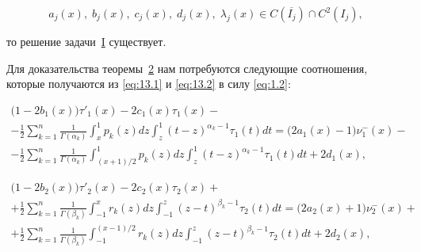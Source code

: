 \begin{equation}

{a_j}(x),\; {b_j}(x),\; {c_j}(x),\; {d_j}(x),\; {\lambda _j}(x) \in C\left( {\overline {{I_j}} } \right) \cap {C^2}\left( {{I_j}} \right),  \label{eq:20.j}

\end{equation}

то решение задачи~\hyperlink{abd:taskI}{\rm I} существует.



\smallskip \rm



Для доказательства теоремы~\hyperlink{abd:th2}{\rm 2} нам потребуются следующие соотношения, которые получаются из \eqref{eq:13.1} и \eqref{eq:13.2} в силу \eqref{eq:1.2}:

\begin{multline}

\bigl( {1 - 2{b_1}(x)} \bigr){\tau '_1}(x) - 2{c_1}(x){\tau _1}(x) - \\

- \frac{1}{2}\sum\limits_{k = 1}^n {\frac{1}{{\Gamma ({\alpha _k})}} \int _x^1 {{p_k}(z)dz \int _z^1 {{{(t - z)}^{{\alpha _k} - 1}}} {\tau _1}(t)} dt}  

= \bigl( {2{a_1}(x) - 1} \bigr)\nu _1^ - (x) -

\\ - \frac{1}{2}\sum\limits_{k = 1}^n {\frac{1}{{\Gamma ({\alpha _k})}} \int _{({{x + 1}})/{2}}^1

 {{p_k}(z)dz \int _z^1 {{{(t - z)}^{{\alpha _k} - 1}}} {\tau _1}(t)} dt}  + 2{d_1}(x),

 \end{multline}

 \begin{multline}

\bigl(1 - 2{b_2}(x)\bigr){\tau '_2}(x) - 2{c_2}(x){\tau _2}(x) + \\

+ \frac{1}{2}\sum\limits_{k = 1}^n {\frac{1}{{\Gamma ({\beta _k})}} \int _{ - 1}^x

{{r_k}(z)dz \int _{ - 1}^z {{{(z - t)}^{{\beta _k} - 1}}} {\tau _2}(t)dt} }  

 = \bigl(2{a_2}(x) + 1\bigr)\nu _2^ - (x) +\\

  + \frac{1}{2}\sum\limits_{k = 1}^n {\frac{1}{{\Gamma ({\beta _k})}} \int _{ - 1}^{({{x - 1}})/{2}}

 {{r_k}(z)dz \int _{ - 1}^z {{{(z - t)}^{{\beta _k} - 1}}} {\tau _2}(t)dt} }  + 2{d_2}(x),

 \end{multline} 

